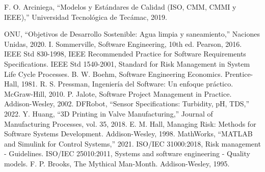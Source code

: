 \documentclass[conference]{IEEEtran}
\begin{document}
\begin{thebibliography}{00}
		 F. O. Arciniega, ``Modelos y Est\'andares de Calidad (ISO, CMM, CMMI y IEEE),'' Universidad Tecnol\'ogica de Tec\'amac, 2019.
		
		 ONU, ``Objetivos de Desarrollo Sostenible: Agua limpia y saneamiento,'' Naciones Unidas, 2020.
		 I. Sommerville, Software Engineering, 10th ed. Pearson, 2016.
		 IEEE Std 830-1998, IEEE Recommended Practice for Software Requirements Specifications.
		 IEEE Std 1540-2001, Standard for Risk Management in System Life Cycle Processes.
		 B. W. Boehm, Software Engineering Economics. Prentice-Hall, 1981.
		 R. S. Pressman, Ingeniería del Software: Un enfoque práctico. McGraw-Hill, 2010.
		 P. Jalote, Software Project Management in Practice. Addison-Wesley, 2002.
		 DFRobot, ``Sensor Specifications: Turbidity, pH, TDS,'' 2022.
		 Y. Huang, ``3D Printing in Valve Manufacturing,'' Journal of Manufacturing Processes, vol. 35, 2018.
		 E. M. Hall, Managing Risk: Methods for Software Systems Development. Addison-Wesley, 1998.
		 MathWorks, ``MATLAB and Simulink for Control Systems,'' 2021.
		 ISO/IEC 31000:2018, Risk management - Guidelines.
		 ISO/IEC 25010:2011, Systems and software engineering - Quality models.
		 F. P. Brooks, The Mythical Man-Month. Addison-Wesley, 1995.


		
	\end{thebibliography}
	
\end{document}

